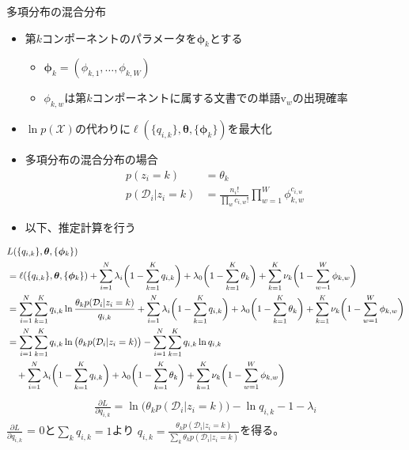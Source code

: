 \documentclass[aspectratio=169,unicode,dvipdfmx,14pt]{beamer}
\begin{document}
\begin{frame}{多項分布の混合分布}
\begin{itemize}
\item 第$k$コンポーネントのパラメータを$\bm{\phi}_k$とする
\begin{itemize}
\item $\bm{\phi}_k = (\phi_{k,1},\ldots,\phi_{k,W})$
\item $\phi_{k,w}$は第$k$コンポーネントに属する文書での単語$\mbox{v}_w$の出現確率
\end{itemize}
\item $\ln p(\mathcal{X})$の代わりに$\ell(\{q_{i,k}\},\bm{\theta}, \{ \bm{\phi}_k \})$を最大化
\item 多項分布の混合分布の場合
\begin{align}
p(z_i=k) & = \theta_k \\
p(\mathcal{D}_i | z_i=k) & = \frac{n_i!}{\prod_w c_{i,w}!} \prod_{w=1}^W \phi_{k,w}^{c_{i,w}}
\end{align}
\item 以下、推定計算を行う
\end{itemize}
\end{frame}

\begin{frame}
\FontMath
\begin{align}
& L(\{q_{i,k}\},\bm{\theta}, \{ \bm{\phi}_k \} ) 
\notag \\ &
= \ell(\{q_{i,k}\},\bm{\theta},\{ \bm{\phi}_k \})
+ \sum_{i=1}^N \lambda_i \bigg(1 - \sum_{k=1}^K q_{i,k}\bigg)
+ \lambda_0 \bigg( 1 - \sum_{k=1}^K \theta_k \bigg)
+ \sum_{k=1}^K \nu_k \bigg( 1 - \sum_{w=1}^W \phi_{k,w} \bigg)
\notag \\ &
= \sum_{i=1}^N \sum_{k=1}^K q_{i,k} \ln\frac{\theta_k p(\mathcal{D}_i | z_i = k)}{q_{i,k}}
+ \sum_{i=1}^N \lambda_i \bigg(1 - \sum_{k=1}^K q_{i,k}\bigg)
+ \lambda_0 \bigg( 1 - \sum_{k=1}^K \theta_k \bigg)
+ \sum_{k=1}^K \nu_k \bigg( 1 - \sum_{w=1}^W \phi_{k,w} \bigg)
\notag \\ &
= 
\sum_{i=1}^N \sum_{k=1}^K q_{i,k} \ln \big( \theta_k p(\mathcal{D}_i | z_i = k) \big)
- \sum_{i=1}^N \sum_{k=1}^K q_{i,k} \ln q_{i,k}
\notag \\ & \mbox{ \ \ }
+ \sum_{i=1}^N \lambda_i \bigg(1 - \sum_{k=1}^K q_{i,k}\bigg)
+ \lambda_0 \bigg( 1 - \sum_{k=1}^K \theta_k \bigg)
+ \sum_{k=1}^K \nu_k \bigg( 1 - \sum_{w=1}^W \phi_{k,w} \bigg)
\end{align}
\begin{align}
\frac{\partial L}{\partial q_{i,k}}
= \ln \big( \theta_k p(\mathcal{D}_i | z_i = k) \big) - \ln q_{i,k} - 1 - \lambda_i
\end{align}
$\frac{\partial L}{\partial q_{i,k}}$ = 0と$\sum_k q_{i,k}=1$より
$q_{i,k} = \frac{ \theta_k p(\mathcal{D}_i | z_i = k) }{ \sum_k \theta_k p(\mathcal{D}_i | z_i = k) }$を得る。
\end{frame}
\end{document}
